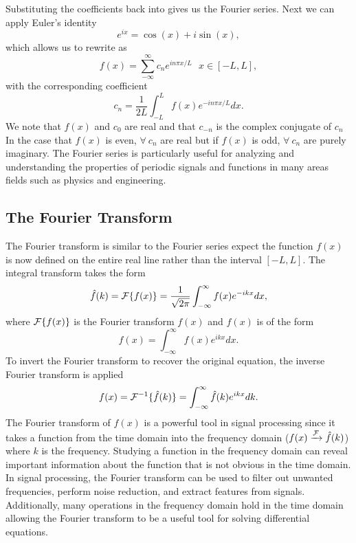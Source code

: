 \documentclass[12pt]{article}%
\numberwithin{equation}{subsection}
\begin{document}
Substituting the coefficients back into  gives us the Fourier series. Next we can apply Euler's identity
\begin{equation}
    e^{ix} = \cos(x) + i\sin(x),
\end{equation}
which allows us to rewrite  as
\begin{equation}
    f(x) = \sum_{-\infty}^{\infty}c_n e^{in\pi x/L} ~~~ x\in[-L, L],
\end{equation}
with the corresponding coefficient
\begin{equation}
    c_n = \frac{1}{2L} \int_{-L}^{L}f(x)e^{-in\pi x/L}dx.
\end{equation}
We note that $f(x)$ and $c_0$ are real and that $c_{-n}$ is the complex conjugate of $c_{n}$ In the case that $f(x)$ is even, $\forall~c_n$ are real but if $f(x)$ is odd, $\forall~c_n$ are purely imaginary. The Fourier series is particularly useful for analyzing and understanding the properties of periodic signals and functions in many areas fields such as physics and engineering. 

\subsection{The Fourier Transform}

The Fourier transform is similar to the Fourier series expect the function $f(x)$ is now defined on the entire real line rather than the interval $[-L,L]$. The integral transform takes the form
\begin{equation}
    \hat{f}(k) = {\mathcal{F}}\{f(x)\} = \frac{1}{\sqrt{2\pi}}\int_{-\infty}^{\infty} f(x) e^{-ikx}dx,
\end{equation} 
where $ {\mathcal{F}}\{f(x)\}$ is the Fourier transform $f(x)$ and $f(x)$ is of the form
\begin{equation}
    f(x) = \int_{-\infty}^{\infty} f(x) e^{ikx}dx.
\end{equation}
To invert the Fourier transform to recover the original equation, the inverse Fourier transform is applied
\begin{equation}
    f(x) = {\mathcal{F}}^{-1}\{ \hat{f}(k)\} = \int_{-\infty}^{\infty} \hat{f}(k)e^{ikx}dk.
\end{equation}
The Fourier transform of $f(x)$ is a powerful tool in signal processing since it takes a function from the time domain into the frequency domain ($f(x) \xrightarrow{{\mathcal{F}}} \hat{f}(k)$) where $k$ is the frequency. Studying a function in the frequency domain can reveal important information about the function that is not obvious in the time domain. In signal processing, the Fourier transform can be used to filter out unwanted frequencies, perform noise reduction, and extract features from signals.  Additionally, many operations in the frequency domain hold in the time domain allowing the Fourier transform to be a useful tool for solving differential equations.   
\end{document}
